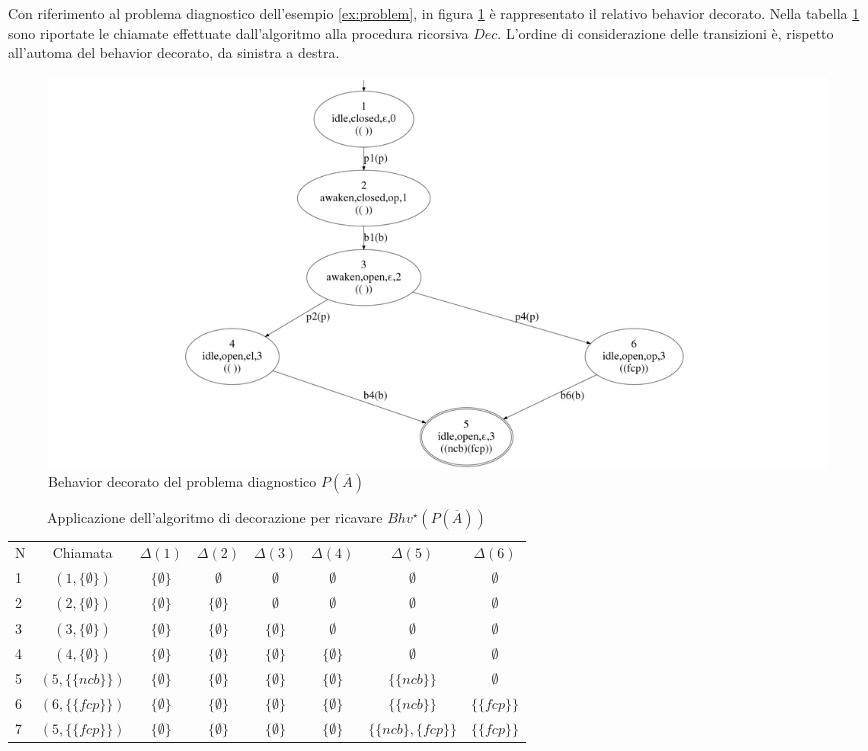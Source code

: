 \begin{ex}
Con riferimento al problema diagnostico dell'esempio \ref{ex:problem}, in figura \ref{fig:bhv_star} è rappresentato il relativo behavior decorato.
Nella tabella \ref{tab:decoration} sono riportate le chiamate effettuate dall'algoritmo alla procedura ricorsiva $Dec$. L'ordine di considerazione delle transizioni è, rispetto all'automa del behavior decorato, da sinistra a destra.
\end{ex}

\begin{figure}[htbp]
\centering
\includegraphics[scale=0.16]{./Img/sa/bhv_star.png}
\caption{Behavior decorato del problema diagnostico $P(\overline{A})$}
\label{fig:bhv_star}
\end{figure}

\begin{table}[htbp] 
\begin{tabularx}{\textwidth}{l c c c c c c c}
\hline
N & Chiamata & $\Delta(1)$ & $\Delta(2)$ & $\Delta(3)$ & $\Delta(4)$ & $\Delta(5)$ & $\Delta(6)$\\
1 & $(1,\{\emptyset\})$ & $\{\emptyset\}$  & $\emptyset$ & $\emptyset$ & $\emptyset$ & $\emptyset$ & $\emptyset$\\
2 & $(2,\{\emptyset\})$ & $\{\emptyset\}$  & $\{\emptyset\}$ & $\emptyset$ & $\emptyset$ & $\emptyset$ & $\emptyset$\\
3 & $(3,\{\emptyset\})$ & $\{\emptyset\}$  & $\{\emptyset\}$ & $\{\emptyset\}$ & $\emptyset$ & $\emptyset$ & $\emptyset$\\
4 & $(4,\{\emptyset\})$ & $\{\emptyset\}$  & $\{\emptyset\}$ & $\{\emptyset\}$ & $\{\emptyset\}$ & $\emptyset$ & $\emptyset$\\
5 & $(5,\{\{ncb\}\})$ & $\{\emptyset\}$  & $\{\emptyset\}$ & $\{\emptyset\}$ & $\{\emptyset\}$ & $\{\{ncb\}\}$ & $\emptyset$\\
6 & $(6,\{\{fcp\}\})$ & $\{\emptyset\}$  & $\{\emptyset\}$ & $\{\emptyset\}$ & $\{\emptyset\}$ & $\{\{ncb\}\}$ & $\{\{fcp\}\}$\\
7 & $(5,\{\{fcp\}\})$ & $\{\emptyset\}$  & $\{\emptyset\}$ & $\{\emptyset\}$ & $\{\emptyset\}$ & $\{\{ncb\},\{fcp\}\}$ & $\{\{fcp\}\}$\\
\hline
\end{tabularx}
\caption{Applicazione dell'algoritmo di decorazione per ricavare $Bhv^\star(P(\overline{A}))$}
\label{tab:decoration}
\end{table}

